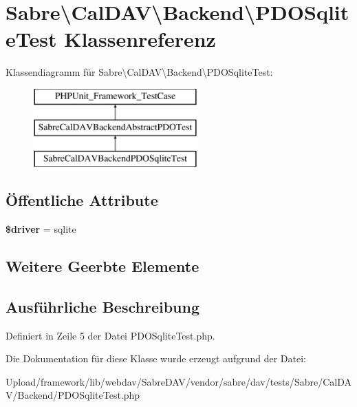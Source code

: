 \hypertarget{class_sabre_1_1_cal_d_a_v_1_1_backend_1_1_p_d_o_sqlite_test}{}\section{Sabre\textbackslash{}Cal\+D\+AV\textbackslash{}Backend\textbackslash{}P\+D\+O\+Sqlite\+Test Klassenreferenz}
\label{class_sabre_1_1_cal_d_a_v_1_1_backend_1_1_p_d_o_sqlite_test}
Klassendiagramm für Sabre\textbackslash{}Cal\+D\+AV\textbackslash{}Backend\textbackslash{}P\+D\+O\+Sqlite\+Test\+:\begin{figure}[H]
\begin{center}
\leavevmode
\includegraphics[height=3.000000cm]{class_sabre_1_1_cal_d_a_v_1_1_backend_1_1_p_d_o_sqlite_test}
\end{center}
\end{figure}
\subsection*{Öffentliche Attribute}
\begin{DoxyCompactItemize}
\item 
\mbox{\label{class_sabre_1_1_cal_d_a_v_1_1_backend_1_1_p_d_o_sqlite_test_a0563025a57e9512d8aa43cb3efcda6fb}} 
{\bfseries \$driver} = \textquotesingle{}sqlite\textquotesingle{}
\end{DoxyCompactItemize}
\subsection*{Weitere Geerbte Elemente}


\subsection{Ausführliche Beschreibung}


Definiert in Zeile 5 der Datei P\+D\+O\+Sqlite\+Test.\+php.



Die Dokumentation für diese Klasse wurde erzeugt aufgrund der Datei\+:\begin{DoxyCompactItemize}
\item 
Upload/framework/lib/webdav/\+Sabre\+D\+A\+V/vendor/sabre/dav/tests/\+Sabre/\+Cal\+D\+A\+V/\+Backend/P\+D\+O\+Sqlite\+Test.\+php\end{DoxyCompactItemize}

